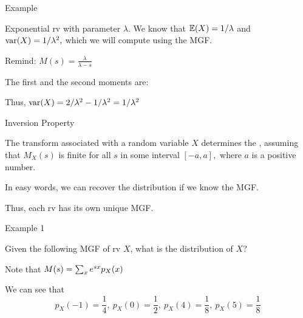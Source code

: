 \begin{frame}{Example}

\plitemsep 0.1in
\bci
\item<1-> Exponential rv with parameter $\lambda.$ We know that $\mathbb{E}( X ) = 1/\lambda$ and
$\text{var}( X ) = 1/\lambda^2,$ which we will compute using the MGF.

\item<2-> Remind: $M(s) = \frac{\lambda}{\lambda -s}$

\item<3-> The first and the second moments are:

\item<4-> Thus, $\text{var}( X ) = 2/\lambda^2 - 1/\lambda^2 = 1/\lambda^2$

\eci

\end{frame}

\begin{frame}{Inversion Property}

{
The transform  associated with a random variable $X$  determines
the , assuming that $M_X(s)$ is finite for all $s$ in some interval $[-a,a],$ where $a$ is a positive number.
}

\plitemsep 0.1in
\bci
\item In easy words, we can recover the distribution if we know the MGF.

\item Thus, each rv has its own unique MGF.

\eci


\end{frame}

\begin{frame}{Example 1}

\plitemsep 0.15in
\bci
\item Given the following MGF of rv $X$, what is the distribution of $X$?
\item<2-> Note that $M(s) = \sum_x e^{sx} p_X(x)$

\item<3-> We can see that
$$
p_X(-1) = \frac{1}{4},  \ p_X(0) = \frac{1}{2}, \ p_X(4) = \frac{1}{8}, \ p_X(5) = \frac{1}{8}
$$
\eci

\end{frame}

